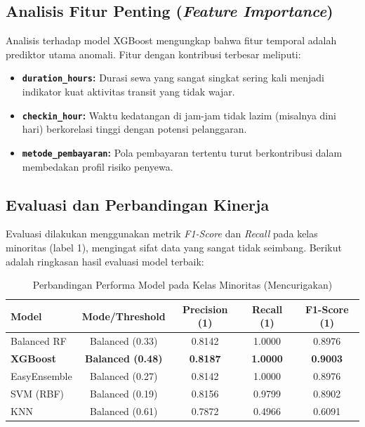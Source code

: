 \subsection{Analisis Fitur Penting (\textit{Feature Importance})}
Analisis terhadap model XGBoost mengungkap bahwa fitur temporal adalah prediktor utama anomali. Fitur dengan kontribusi terbesar meliputi:
\begin{itemize}
    \item \textbf{\texttt{duration\_hours}:} Durasi sewa yang sangat singkat sering kali menjadi indikator kuat aktivitas transit yang tidak wajar.
    \item \textbf{\texttt{checkin\_hour}:} Waktu kedatangan di jam-jam tidak lazim (misalnya dini hari) berkorelasi tinggi dengan potensi pelanggaran.
    \item \textbf{\texttt{metode\_pembayaran}:} Pola pembayaran tertentu turut berkontribusi dalam membedakan profil risiko penyewa.
\end{itemize}




\subsection{Evaluasi dan Perbandingan Kinerja}
Evaluasi dilakukan menggunakan metrik \textit{F1-Score} dan \textit{Recall} pada kelas minoritas (label 1), mengingat sifat data yang sangat tidak seimbang. Berikut adalah ringkasan hasil evaluasi model terbaik:

\begin{table}[H]
\centering
\caption{Perbandingan Performa Model pada Kelas Minoritas (Mencurigakan)}
\label{tab:model_comparison}
    \begin{tabular}{|l|c|c|c|c|}
    \hline
    \textbf{Model} & \textbf{Mode/Threshold} & \textbf{Precision (1)} & \textbf{Recall (1)} & \textbf{F1-Score (1)} \\
    \hline
    Balanced RF & Balanced (0.33) & 0.8142 & 1.0000 & 0.8976 \\
    \hline
    \textbf{XGBoost} & \textbf{Balanced (0.48)} & \textbf{0.8187} & \textbf{1.0000} & \textbf{0.9003} \\
    \hline
    EasyEnsemble & Balanced (0.27) & 0.8142 & 1.0000 & 0.8976 \\
    \hline
    SVM (RBF) & Balanced (0.19) & 0.8156 & 0.9799 & 0.8902 \\
    \hline
    KNN & Balanced (0.61) & 0.7872 & 0.4966 & 0.6091 \\
    \hline
    \end{tabular}
\end{table}

